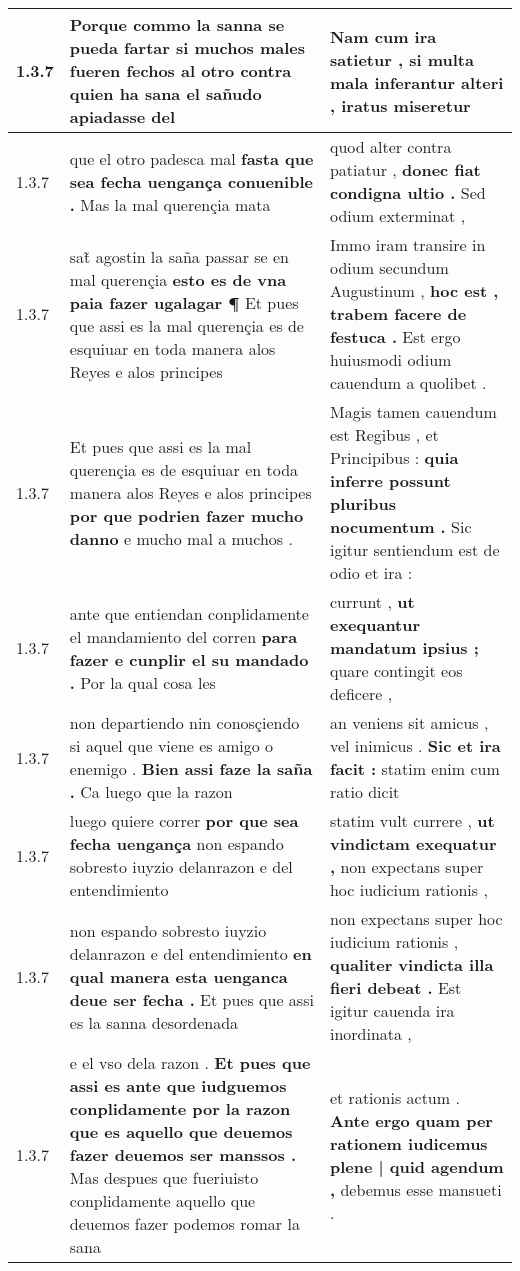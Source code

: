 \begin{tabular}{|p{1cm}|p{6.5cm}|p{6.5cm}|}
1.3.7 & Porque commo la sanna se pueda fartar \textbf{ si muchos males fueren fechos al otro } contra quien ha sana el sañudo apiadasse del & Nam cum ira satietur , \textbf{ si multa mala inferantur alteri , } iratus miseretur \\\hline
1.3.7 & que el otro padesca mal \textbf{ fasta que sea fecha uengança conuenible . } Mas la mal querençia mata & quod alter contra patiatur , \textbf{ donec fiat condigna ultio . } Sed odium exterminat , \\\hline
1.3.7 & sat̃ agostin la saña passar se en mal querençia \textbf{ esto es de vna paia fazer ugalagar ¶ } Et pues que assi es la mal querençia es de esquiuar en toda manera alos Reyes e alos principes & Immo iram transire in odium secundum Augustinum , \textbf{ hoc est , trabem facere de festuca . } Est ergo huiusmodi odium cauendum a quolibet . \\\hline
1.3.7 & Et pues que assi es la mal querençia es de esquiuar en toda manera alos Reyes e alos principes \textbf{ por que podrien fazer mucho danno } e mucho mal a muchos . & Magis tamen cauendum est Regibus , et Principibus : \textbf{ quia inferre possunt pluribus nocumentum . } Sic igitur sentiendum est de odio et ira : \\\hline
1.3.7 & ante que entiendan conplidamente el mandamiento del corren \textbf{ para fazer e cunplir el su mandado . } Por la qual cosa les & currunt , \textbf{ ut exequantur mandatum ipsius ; } quare contingit eos deficere , \\\hline
1.3.7 & non departiendo nin conosçiendo si aquel que viene es amigo o enemigo . \textbf{ Bien assi faze la saña . } Ca luego que la razon & an veniens sit amicus , vel inimicus . \textbf{ Sic et ira facit : } statim enim cum ratio dicit \\\hline
1.3.7 & luego quiere correr \textbf{ por que sea fecha uengança } non espando sobresto iuyzio delanrazon e del entendimiento & statim vult currere , \textbf{ ut vindictam exequatur , } non expectans super hoc iudicium rationis , \\\hline
1.3.7 & non espando sobresto iuyzio delanrazon e del entendimiento \textbf{ en qual manera esta uenganca deue ser fecha . } Et pues que assi es la sanna desordenada & non expectans super hoc iudicium rationis , \textbf{ qualiter vindicta illa fieri debeat . } Est igitur cauenda ira inordinata , \\\hline
1.3.7 & e el vso dela razon . \textbf{ Et pues que assi es ante que iudguemos conplidamente por la razon que es aquello que deuemos fazer deuemos ser manssos . } Mas despues que fueriuisto conplidamente aquello que deuemos fazer podemos romar la sana & et rationis actum . \textbf{ Ante ergo quam per rationem iudicemus plene | quid agendum , } debemus esse mansueti . \\\hline

\end{tabular}
